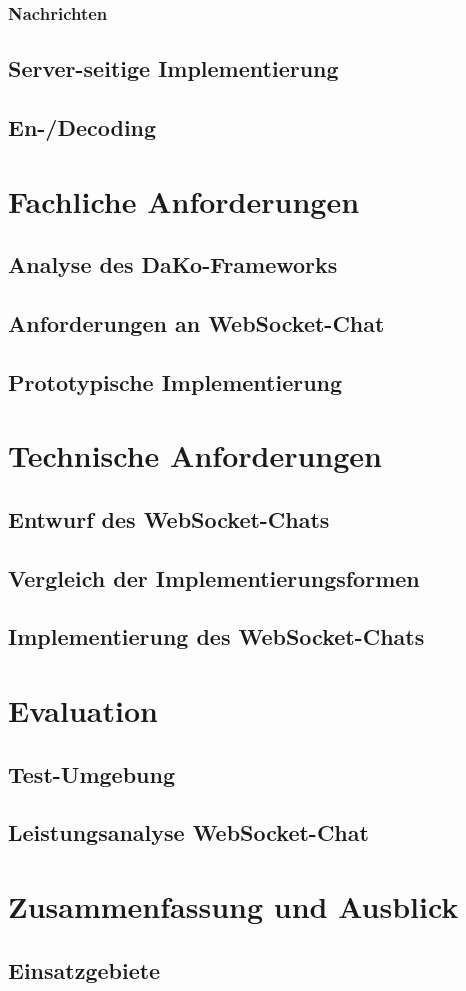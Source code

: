 \documentclass[11pt,a4paper,titlepage]{scrartcl}
\numberwithin{equation}{section}
\begin{document}
\subsubsection{Nachrichten}
\subsection{Server-seitige Implementierung}

\subsection{En-/Decoding}


\section{Fachliche Anforderungen}
\subsection{Analyse des DaKo-Frameworks}
\subsection{Anforderungen an WebSocket-Chat}
\subsection{Prototypische Implementierung}

\section{Technische Anforderungen}
\subsection{Entwurf des WebSocket-Chats}
\subsection{Vergleich der Implementierungsformen}
\subsection{Implementierung des WebSocket-Chats}

\section{Evaluation}
\subsection{Test-Umgebung}
\subsection{Leistungsanalyse WebSocket-Chat}

\section{Zusammenfassung und Ausblick}
\subsection{Einsatzgebiete}

\newpage
{}
\printbibliography
\newpage
\listoffigures
\newpage
\listoftables
\end{document}
